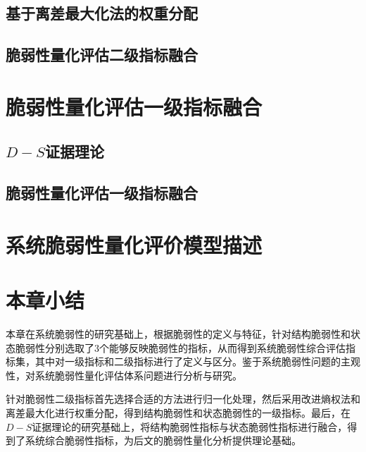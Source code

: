 \subsection{基于离差最大化法的权重分配}
\label{sec:nomalz}



\subsection{脆弱性量化评估二级指标融合}
\label{sec:2ndIndexMerge}





\section{脆弱性量化评估一级指标融合}




\subsection{$D-S$证据理论}
\label{sec:DStheory}





\subsection{脆弱性量化评估一级指标融合}
\label{sec:DSdistri}






\section{系统脆弱性量化评价模型描述}
\label{sec:systemQuan}





\section{本章小结}
\label{sec:sum4}
本章在系统脆弱性的研究基础上，根据脆弱性的定义与特征，针对结构脆弱性和状态脆弱性分别选取了3个能够反映脆弱性的指标，从而得到系统脆弱性综合评估指标集，其中对一级指标和二级指标进行了定义与区分。鉴于系统脆弱性问题的主观性，对系统脆弱性量化评估体系问题进行分析与研究。

针对脆弱性二级指标首先选择合适的方法进行归一化处理，然后采用改进熵权法和离差最大化进行权重分配，得到结构脆弱性和状态脆弱性的一级指标。最后，在$D-S$证据理论的研究基础上，将结构脆弱性指标与状态脆弱性指标进行融合，得到了系统综合脆弱性指标，为后文的脆弱性量化分析提供理论基础。



